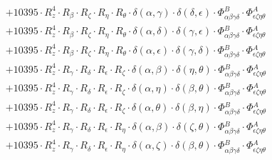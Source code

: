 \documentclass{article}
\begin{document}
\begin{equation}
\begin{array}{c}
 \\[0.2em] 		 + 10395 \cdot R_{z}^{4} \cdot R_{\beta{}} \cdot R_{\zeta{}} \cdot R_{\eta{}} \cdot R_{\theta{}} \cdot \delta{}\left(\alpha{}, \gamma{}\right) \cdot \delta{}\left(\delta{}, \epsilon{}\right) \cdot \Phi{}^{B}_{\alpha{}\beta{}\gamma{}\delta{}} \cdot \Phi{}^{A}_{\epsilon{}\zeta{}\eta{}\theta{}} 
 \\[0.2em] 		 + 10395 \cdot R_{z}^{4} \cdot R_{\beta{}} \cdot R_{\zeta{}} \cdot R_{\eta{}} \cdot R_{\theta{}} \cdot \delta{}\left(\alpha{}, \delta{}\right) \cdot \delta{}\left(\gamma{}, \epsilon{}\right) \cdot \Phi{}^{B}_{\alpha{}\beta{}\gamma{}\delta{}} \cdot \Phi{}^{A}_{\epsilon{}\zeta{}\eta{}\theta{}} 
 \\[0.2em] 		 + 10395 \cdot R_{z}^{4} \cdot R_{\beta{}} \cdot R_{\zeta{}} \cdot R_{\eta{}} \cdot R_{\theta{}} \cdot \delta{}\left(\alpha{}, \epsilon{}\right) \cdot \delta{}\left(\gamma{}, \delta{}\right) \cdot \Phi{}^{B}_{\alpha{}\beta{}\gamma{}\delta{}} \cdot \Phi{}^{A}_{\epsilon{}\zeta{}\eta{}\theta{}} 
 \\[0.2em] 		 + 10395 \cdot R_{z}^{4} \cdot R_{\gamma{}} \cdot R_{\delta{}} \cdot R_{\epsilon{}} \cdot R_{\zeta{}} \cdot \delta{}\left(\alpha{}, \beta{}\right) \cdot \delta{}\left(\eta{}, \theta{}\right) \cdot \Phi{}^{B}_{\alpha{}\beta{}\gamma{}\delta{}} \cdot \Phi{}^{A}_{\epsilon{}\zeta{}\eta{}\theta{}} 
 \\[0.2em] 		 + 10395 \cdot R_{z}^{4} \cdot R_{\gamma{}} \cdot R_{\delta{}} \cdot R_{\epsilon{}} \cdot R_{\zeta{}} \cdot \delta{}\left(\alpha{}, \eta{}\right) \cdot \delta{}\left(\beta{}, \theta{}\right) \cdot \Phi{}^{B}_{\alpha{}\beta{}\gamma{}\delta{}} \cdot \Phi{}^{A}_{\epsilon{}\zeta{}\eta{}\theta{}} 
 \\[0.2em] 		 + 10395 \cdot R_{z}^{4} \cdot R_{\gamma{}} \cdot R_{\delta{}} \cdot R_{\epsilon{}} \cdot R_{\zeta{}} \cdot \delta{}\left(\alpha{}, \theta{}\right) \cdot \delta{}\left(\beta{}, \eta{}\right) \cdot \Phi{}^{B}_{\alpha{}\beta{}\gamma{}\delta{}} \cdot \Phi{}^{A}_{\epsilon{}\zeta{}\eta{}\theta{}} 
 \\[0.2em] 		 + 10395 \cdot R_{z}^{4} \cdot R_{\gamma{}} \cdot R_{\delta{}} \cdot R_{\epsilon{}} \cdot R_{\eta{}} \cdot \delta{}\left(\alpha{}, \beta{}\right) \cdot \delta{}\left(\zeta{}, \theta{}\right) \cdot \Phi{}^{B}_{\alpha{}\beta{}\gamma{}\delta{}} \cdot \Phi{}^{A}_{\epsilon{}\zeta{}\eta{}\theta{}} 
 \\[0.2em] 		 + 10395 \cdot R_{z}^{4} \cdot R_{\gamma{}} \cdot R_{\delta{}} \cdot R_{\epsilon{}} \cdot R_{\eta{}} \cdot \delta{}\left(\alpha{}, \zeta{}\right) \cdot \delta{}\left(\beta{}, \theta{}\right) \cdot \Phi{}^{B}_{\alpha{}\beta{}\gamma{}\delta{}} \cdot \Phi{}^{A}_{\epsilon{}\zeta{}\eta{}\theta{}} 

\end{array}
\end{equation}
\end{document}
